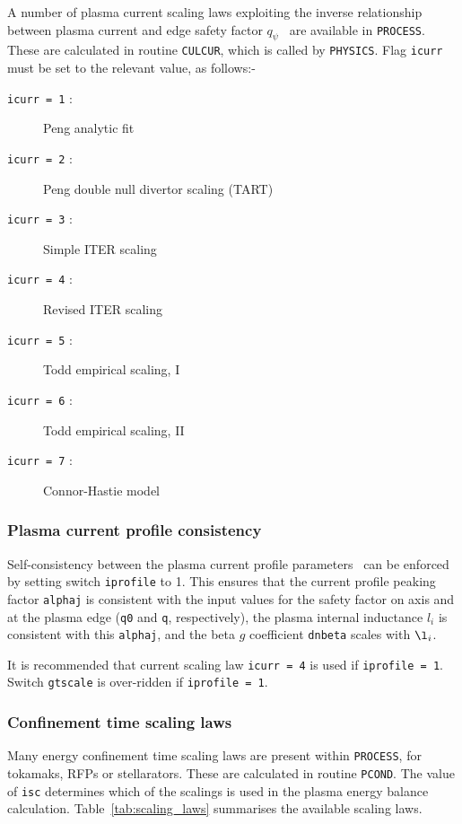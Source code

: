 \documentclass[11pt,a4paper]{report}
\newcommand{\process}{\mbox{\texttt{PROCESS}}}
\begin{document}
A number of plasma current scaling laws exploiting the inverse relationship
between plasma current and edge safety factor $q_{\psi}$~\cite{172} are
available in \process. These are calculated in routine \texttt{CULCUR}, which
is called by \texttt{PHYSICS}.  Flag \texttt{icurr} must be set to the
relevant value, as follows:-
\begin{description}
\item [\texttt{icurr = 1} :] Peng analytic fit
\item [\texttt{icurr = 2} :] Peng double null divertor scaling (TART)~\cite{storac}
\item [\texttt{icurr = 3} :] Simple ITER scaling
\item [\texttt{icurr = 4} :] Revised ITER scaling~\cite{Uckan88}
\item [\texttt{icurr = 5} :] Todd empirical scaling, I
\item [\texttt{icurr = 6} :] Todd empirical scaling, II
\item [\texttt{icurr = 7} :] Connor-Hastie model
\end{description}

\subsubsection{Plasma current profile consistency}
\label{sec:current_profile}

Self-consistency between the plasma current profile
parameters~\cite{DEMOPhysicsGuidelines} can be enforced by setting switch
\texttt{iprofile} to 1. This ensures that the current profile peaking factor
\texttt{alphaj} is consistent with the input values for the safety factor on
axis and at the plasma edge (\texttt{q0} and \texttt{q}, respectively), the
plasma internal inductance $l_i$ is consistent with this \texttt{alphaj}, and
the beta $g$ coefficient \texttt{dnbeta} scales with $\l_i$.

It is recommended that current scaling law \texttt{icurr = 4} is used if
\texttt{iprofile = 1}. Switch \texttt{gtscale} is over-ridden if
\texttt{iprofile = 1}.

\subsubsection{Confinement time scaling laws}
\label{sec:taue}

Many energy confinement time scaling laws are present within \process, for
tokamaks, RFPs or stellarators. These are calculated in routine
\texttt{PCOND}. The value of \texttt{isc} determines which of the scalings is
used in the plasma energy balance calculation.  Table~\ref{tab:scaling_laws}
summarises the available scaling laws.
\end{document}
